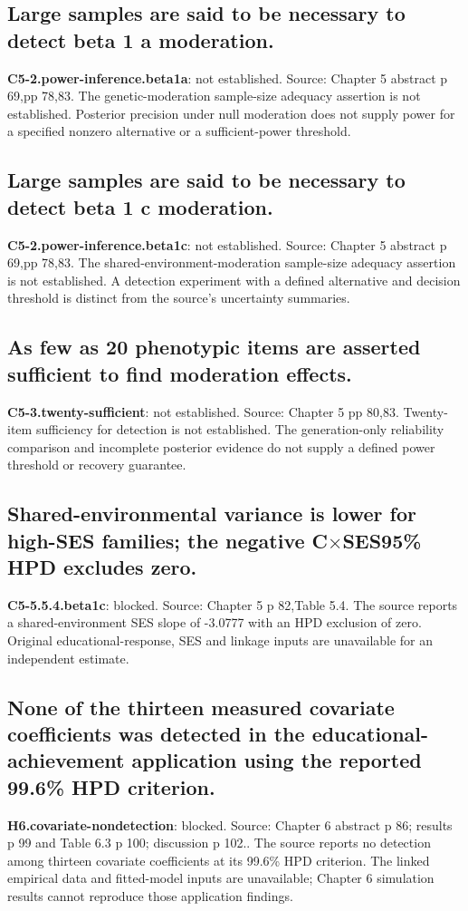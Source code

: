 \documentclass[11pt]{article}
\begin{document}
\subsection{Large samples are said to be necessary to detect beta 1 a moderation.}
\textbf{C5-2.power-inference.beta1a}: not established. Source: Chapter 5 abstract p 69,pp 78,83. The genetic-moderation sample-size adequacy assertion is not established. Posterior precision under null moderation does not supply power for a specified nonzero alternative or a sufficient-power threshold.
\subsection{Large samples are said to be necessary to detect beta 1 c moderation.}
\textbf{C5-2.power-inference.beta1c}: not established. Source: Chapter 5 abstract p 69,pp 78,83. The shared-environment-moderation sample-size adequacy assertion is not established. A detection experiment with a defined alternative and decision threshold is distinct from the source's uncertainty summaries.
\subsection{As few as 20 phenotypic items are asserted sufficient to find moderation effects.}
\textbf{C5-3.twenty-sufficient}: not established. Source: Chapter 5 pp 80,83. Twenty-item sufficiency for detection is not established. The generation-only reliability comparison and incomplete posterior evidence do not supply a defined power threshold or recovery guarantee.
\subsection{Shared-environmental variance is lower for high-SES families; the negative C$\times$SES95\% HPD excludes zero.}
\textbf{C5-5.5.4.beta1c}: blocked. Source: Chapter 5 p 82,Table 5.4. The source reports a shared-environment SES slope of -3.0777 with an HPD exclusion of zero. Original educational-response, SES and linkage inputs are unavailable for an independent estimate.
\subsection{None of the thirteen measured covariate coefficients was detected in the educational-achievement application using the reported 99.6\% HPD criterion.}
\textbf{H6.covariate-nondetection}: blocked. Source: Chapter 6 abstract p 86; results p 99 and Table 6.3 p 100; discussion p 102.. The source reports no detection among thirteen covariate coefficients at its 99.6\% HPD criterion. The linked empirical data and fitted-model inputs are unavailable; Chapter 6 simulation results cannot reproduce those application findings.
\end{document}
